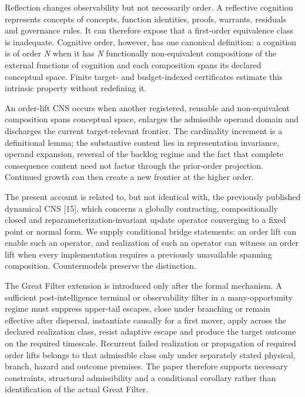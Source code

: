 Reflection changes observability but not necessarily order. A reflective
cognition represents concepts of concepts, function identities, proofs,
warrants, residuals and governance rules. It can therefore expose that a
first-order equivalence class is inadequate. Cognitive order, however,
has one canonical definition: a cognition is of order \emph{N} when it
has \emph{N} functionally non-equivalent compositions of the external
functions of cognition and each composition spans its declared
conceptual space. Finite target- and budget-indexed certificates
estimate this intrinsic property without redefining it.

An order-lift CNS occurs when another registered, reusable and
non-equivalent composition spans conceptual space, enlarges the
admissible operand domain and discharges the current target-relevant
frontier. The cardinality increment is a definitional lemma; the
substantive content lies in representation invariance, operand
expansion, reversal of the backlog regime and the fact that complete
consequence content need not factor through the prior-order projection.
Continued growth can then create a new frontier at the higher order.

The present account is related to, but not identical with, the
previously published dynamical CNS {[}15{]}, which concerns a globally
contracting, compositionally closed and reparameterization-invariant
update operator converging to a fixed point or normal form. We supply
conditional bridge statements: an order lift can enable such an
operator, and realization of such an operator can witness an order lift
when every implementation requires a previously unavailable spanning
composition. Countermodels preserve the distinction.

The Great Filter extension is introduced only after the formal
mechanism. A sufficient post-intelligence terminal or observability
filter in a many-opportunity regime must suppress upper-tail escapes,
close under branching or remain effective after dispersal, instantiate
causally for a first mover, apply across the declared realization class,
resist adaptive escape and produce the target outcome on the required
timescale. Recurrent failed realization or propagation of required order
lifts belongs to that admissible class only under separately stated
physical, branch, hazard and outcome premises. The paper therefore
supports necessary constraints, structural admissibility and a
conditional corollary rather than identification of the actual Great
Filter.

